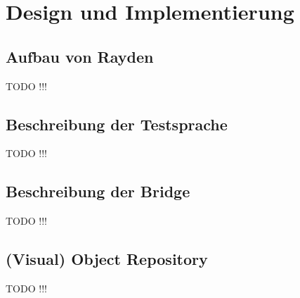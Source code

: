 ﻿\chapter{Design und Implementierung}
\label{cha:DesignUndImplementierung}

\section{Aufbau von Rayden}

TODO !!!

\section{Beschreibung der Testsprache}

TODO !!!

\section{Beschreibung der Bridge}

TODO !!!

\section{(Visual) Object Repository}

TODO !!!

